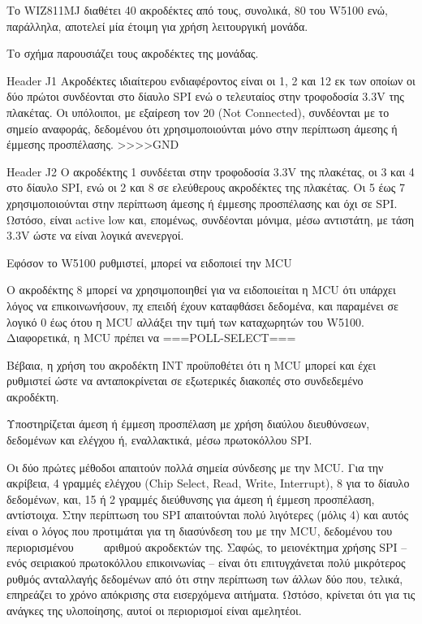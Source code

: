 Το WIZ811MJ διαθέτει 40 ακροδέκτες από τους, συνολικά, 80 του W5100 ενώ,
παράλληλα, αποτελεί μία έτοιμη για χρήση λειτουργική μονάδα.

Το σχήμα \nref{} παρουσιάζει τους ακροδέκτες της μονάδας.

Header J1
Ακροδέκτες ιδιαίτερου ενδιαφέροντος είναι οι 1, 2 και 12 εκ των οποίων οι δύο
πρώτοι συνδέονται στο δίαυλο SPI ενώ ο τελευταίος στην τροφοδοσία 3.3V της
πλακέτας. Οι υπόλοιποι, με εξαίρεση τον 20 (\textenglish{Not Connected}),
συνδέονται με το σημείο αναφοράς, δεδομένου ότι χρησιμοποιούνται μόνο στην
περίπτωση άμεσης ή έμμεσης προσπέλασης.
>>>>GND

Header J2
Ο ακροδέκτης 1 συνδέεται στην τροφοδοσία 3.3V της πλακέτας, οι 3 και 4 στο
δίαυλο SPI, ενώ οι 2 και 8 σε ελεύθερους ακροδέκτες της πλακέτας.
Οι 5 έως 7 χρησιμοποιούνται στην περίπτωση άμεσης ή έμμεσης προσπέλασης και όχι
σε SPI. Ωστόσο, είναι active low και, επομένως, συνδέονται μόνιμα, μέσω
αντιστάτη, με τάση 3.3V ώστε να είναι λογικά ανενεργοί.

Εφόσον το W5100 ρυθμιστεί, μπορεί να ειδοποιεί την MCU 

Ο ακροδέκτης 8 μπορεί να χρησιμοποιηθεί για να ειδοποιείται η MCU ότι υπάρχει
λόγος να επικοινωνήσουν, πχ επειδή έχουν καταφθάσει δεδομένα, και παραμένει σε
λογικό 0 έως ότου η MCU αλλάξει την τιμή των καταχωρητών του W5100. Διαφορετικά,
η MCU πρέπει να ===POLL-SELECT===

Βέβαια, η χρήση του ακροδέκτη INT προϋποθέτει ότι η MCU μπορεί και έχει
ρυθμιστεί ώστε να ανταποκρίνεται σε εξωτερικές διακοπές στο συνδεδεμένο
ακροδέκτη.

Υποστηρίζεται άμεση ή έμμεση προσπέλαση με χρήση διαύλου διευθύνσεων, δεδομένων
και ελέγχου ή, εναλλακτικά, μέσω πρωτοκόλλου SPI.

Οι δύο πρώτες μέθοδοι απαιτούν πολλά σημεία σύνδεσης με την MCU. Για την
ακρίβεια, 4 γραμμές ελέγχου (Chip Select, Read, Write, Interrupt), 8 για το
δίαυλο δεδομένων, και, 15 ή 2 γραμμές διεύθυνσης για άμεση ή έμμεση προσπέλαση,
αντίστοιχα.
Στην περίπτωση του SPI απαιτούνται πολύ λιγότερες (μόλις 4) και αυτός είναι ο
λόγος που προτιμάται για τη διασύνδεση του με την MCU, δεδομένου του περιορισμένου   ~~~~
αριθμού ακροδεκτών της. Σαφώς, το μειονέκτημα χρήσης SPI -- ενός σειριακού
πρωτοκόλλου επικοινωνίας -- είναι ότι επιτυγχάνεται πολύ μικρότερος ρυθμός
ανταλλαγής δεδομένων από ότι στην περίπτωση των άλλων δύο που, τελικά, επηρεάζει
το χρόνο απόκρισης στα εισερχόμενα αιτήματα. Ωστόσο, κρίνεται ότι για τις
ανάγκες της υλοποίησης, αυτοί οι περιορισμοί είναι αμελητέοι.

